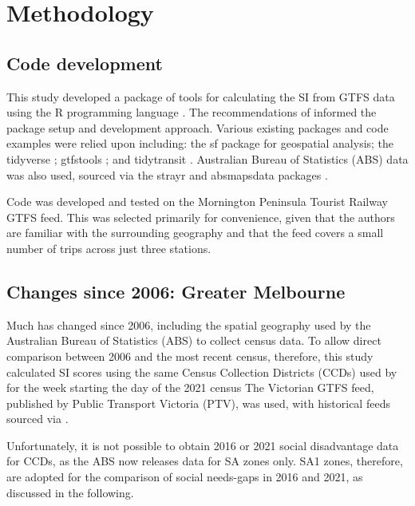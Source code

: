 \documentclass[preprint, 3p,
authoryear]{elsarticle} %
\begin{document}
\section{Methodology}\label{methodology}

\subsection{Code development}\label{code-development}

This study developed a package of tools for calculating the SI from GTFS
data using the R programming language \citep{R-base}. The
recommendations of \citet{wickham2023r} informed the package setup and
development approach. Various existing packages and code examples were
relied upon including: the sf package \citep{R-sf} for geospatial
analysis; the tidyverse \citep{tidyverse2019}; gtfstools
\citep{R-gtfstools}; and tidytransit \citep{R-tidytransit}. Australian
Bureau of Statistics (ABS) data was also used, sourced via the strayr
and absmapsdata packages \citep{r-strayr}.

Code was developed and tested on the Mornington Peninsula Tourist
Railway GTFS feed. This was selected primarily for convenience, given
that the authors are familiar with the surrounding geography and that
the feed covers a small number of trips across just three stations.

\subsection{Changes since 2006: Greater
Melbourne}\label{changes-since-2006-greater-melbourne}

Much has changed since 2006, including the spatial geography used by the
Australian Bureau of Statistics (ABS) to collect census data. To allow
direct comparison between 2006 and the most recent census, therefore,
this study calculated SI scores using the same Census Collection
Districts (CCDs) used by \citet{currie2010identifying} for the week
starting the day of the 2021 census The Victorian GTFS feed, published
by Public Transport Victoria (PTV), was used, with historical feeds
sourced via \citet{transitfeeds_victoria:2023aa}.

Unfortunately, it is not possible to obtain 2016 or 2021 social
disadvantage data for CCDs, as the ABS now releases data for SA zones
only. SA1 zones, therefore, are adopted for the comparison of social
needs-gaps in 2016 and 2021, as discussed in the following.
\end{document}
